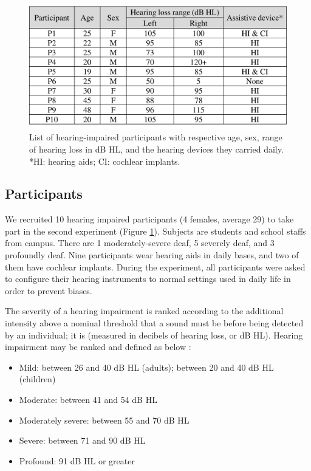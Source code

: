 \documentclass{sigchi}
\begin{document}
\begin{figure}[!h]
\centering
\includegraphics[width=\columnwidth]{participants}
\caption{List of hearing-impaired participants with respective age, sex, range of hearing loss in dB HL, and the hearing devices they carried daily. *HI: hearing aids; CI: cochlear implants.}
\label{fig:participants}
\end{figure}

\subsection{Participants}
We recruited 10 hearing impaired participants (4 females, average 29) to take part in the second experiment (Figure \ref{fig:participants}). Subjects are students and school staffs from campus. There are 1 moderately-severe deaf, 5 severely deaf, and 3 profoundly deaf. Nine participants wear hearing aids in daily bases, and two of them have cochlear implants. During the experiment, all participants were asked to configure their hearing instruments to normal settings used in daily life in order to prevent biases.

The severity of a hearing impairment is ranked according to the additional intensity above a nominal threshold that a sound must be before being detected by an individual; it is (measured in decibels of hearing loss, or dB HL). Hearing impairment may be ranked and defined as below \cite{Elzouki2012}:

\begin{itemize}
\item Mild: between 26 and 40 dB HL (adults); between 20 and 40 dB HL (children)
\item Moderate: between 41 and 54 dB HL
\item Moderately severe: between 55 and 70 dB HL
\item Severe: between 71 and 90 dB HL
\item Profound: 91 dB HL or greater
\end{itemize}
\end{document}
